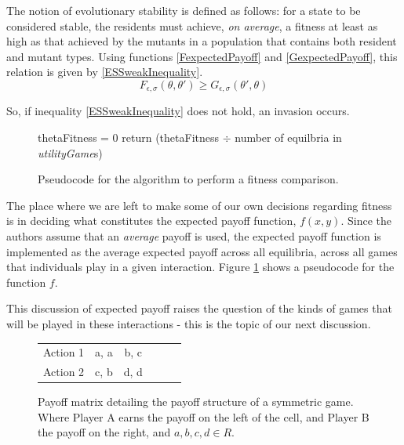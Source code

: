 \documentclass[11pt]{book}
\newcommand*{\np}{\par\noindent\newline}
\begin{document}
\np The notion of evolutionary stability is defined as follows: for a state to be considered stable, the residents must achieve, \textit{on average}, a fitness at least as high as that achieved by the mutants in a population that contains both resident and mutant types.
Using functions \ref{FexpectedPayoff} and \ref{GexpectedPayoff}, this relation is given by \ref{ESSweakInequality}.
\begin{equation}
	\label{ESSweakInequality}
	F_{\epsilon, \sigma}(\theta, \theta') \geq G_{\epsilon, \sigma}(\theta', \theta)
\end{equation}
\citet[~p. 44]{alger_generalization_2012}
\np So, if inequality \ref{ESSweakInequality} does not hold, an invasion occurs.

\begin{figure}[H]
	\centering
	\begin{algorithm}[H]
		thetaFitness = 0\;
		return (thetaFitness $\div$ number of equilbria in \textit{utilityGame}s)\;
	   \end{algorithm}
	\caption{Pseudocode for the algorithm to perform a fitness comparison.}
	\label{psuedocodeForf}
\end{figure}

\np The place where we are left to make some of our own decisions regarding fitness is in deciding what constitutes the expected payoff function, $f(x,y)$.
Since the authors assume that an \textit{average} payoff is used, the expected payoff function is implemented as the average expected payoff across all equilibria, across all games that individuals play in a given interaction.
Figure \ref{psuedocodeForf} shows a pseudocode for the function $f$.

\np This discussion of expected payoff raises the question of the kinds of games that will be played in these interactions - this is the topic of our next discussion.

\begin{figure}[H]
	\vspace{30px}
	\centering
	\begin{tabular}{|l||*{5}{c|}}\hline
		\backslashbox{Player A}{Player B}
		&\makebox[7em]{Action 1}&\makebox[7em]{Action 2}\\\hline\hline
		Action 1 & a, a & b, c\\\hline
		Action 2 & c, b & d, d \\\hline
	\end{tabular}
	\caption{Payoff matrix detailing the payoff structure of a symmetric game. Where Player A earns the payoff on the left of the cell, and Player B the payoff on the right, and ${a, b, c, d} \in R$.}
	\label{symmetricGame}
	\vspace{20px}
\end{figure}
\end{document}
